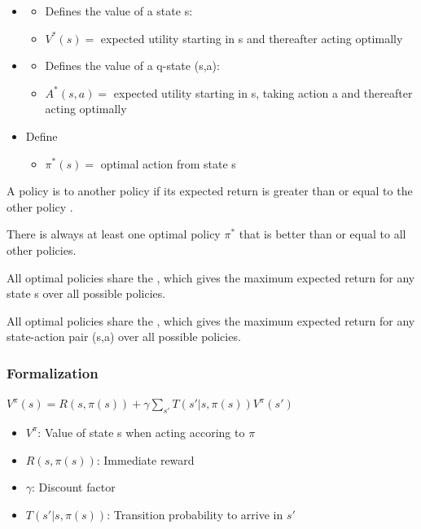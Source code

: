 \documentclass[
../EiKI_Summary.tex,
]
{subfiles}
\begin{document}
\begin{itemize}
    \item {}
    \begin{itemize}
        \item Defines the value of a state s:
        \item $V^\ast(s) =$ expected utility starting in s and thereafter acting optimally
    \end{itemize}
    \item {}
    \begin{itemize}
        \item Defines the value of a q-state (s,a):
        \item $A^\ast(s,a) =$ expected utility starting in s, taking action a and thereafter acting optimally
    \end{itemize}
    \item Define 
    \begin{itemize}
        \item $\pi^\ast(s) =$ optimal action from state s
    \end{itemize}
\end{itemize}

A policy is  to another policy if its expected return is greater than or equal to the other policy .

There is always at least one optimal policy $\pi^\ast$ that is better than or equal to all other policies.

All optimal policies share the , which gives the maximum expected return for any state s over all possible policies.

All optimal policies share the , which gives the maximum expected return for any state-action pair (s,a) over all possible policies.

\subsubsection*{Formalization}

\begin{csmb*}
    $\displaystyle V^\pi(s)= R(s,\pi(s)) + \gamma \sum_{s'} T(s' | s, \pi(s)) V^\pi(s')$
\end{csmb*}

\begin{itemize}
    \item $V^\pi$: Value of state s when acting accoring to $\pi$
    \item $R(s,\pi(s))$: Immediate reward
    \item $\gamma$: Discount factor
    \item $T(s'|s,\pi(s))$: Transition probability to arrive in $s'$
\end{itemize}
\end{document}
